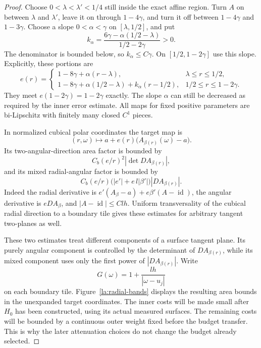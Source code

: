 \documentclass[11pt]{article}
\numberwithin{equation}{section}
\theoremstyle{definition}
\theoremstyle{remark}
\begin{document}
\begin{proof}
Choose $0<\lambda<\lambda'<1/4$ still inside the exact affine region.
Turn $A$ on between $\lambda$ and $\lambda'$, leave it on through
$1-4\gamma$, and turn it off between $1-4\gamma$ and $1-3\gamma$.
Choose a slope $0<\alpha<\gamma$ on $[\lambda,1/2]$, and put
\[
 k_\alpha=
 \frac{6\gamma-\alpha(1/2-\lambda)}{1/2-2\gamma}>0.
\]
The denominator is bounded below, so $k_\alpha\le C\gamma$.
On $[1/2,1-2\gamma]$ use this slope.  Explicitly, these portions are
\[
 e(r)=
 \begin{cases}
  1-8\gamma+\alpha(r-\lambda),&\lambda\le r\le1/2,\\
  1-8\gamma+\alpha(1/2-\lambda)+k_\alpha(r-1/2),
       &1/2\le r\le1-2\gamma.
 \end{cases}
\]
They meet $e(1-2\gamma)=1-2\gamma$ exactly.  The slope $\alpha$
can still be decreased as required by the inner error estimate.
All maps for fixed positive parameters are bi-Lipschitz with
finitely many closed $C^1$ pieces.

In normalized cubical polar coordinates the target map is
\[
 (r,\omega)\longmapsto
       a+e(r)\bigl(A_{\beta(r)}(\omega)-a\bigr).
\]
Its two-angular-direction area factor is bounded by
\begin{equation}\label{la:two-angular}
 C_b(e/r)^2|\det DA_{\beta(r)}|,
\end{equation}
and its mixed radial-angular factor is bounded by
\begin{equation}\label{la:mixed-angular}
 C_b(e/r)\bigl(|e'|+e\,l|\beta'|\bigr)|DA_{\beta(r)}|.
\end{equation}
Indeed the radial derivative is
$e'(A_\beta-a)+e\beta'(A-\operatorname{id})$, the angular derivative is $eDA_\beta$,
and $|A-\operatorname{id}|\le Clh$.  Uniform transversality of the cubical radial
direction to a boundary tile gives these estimates for arbitrary
tangent two-planes as well.

These two estimates treat different components of a surface tangent
plane.  Its purely angular component is controlled by the determinant
of $DA_{\beta(r)}$, while its mixed component uses only the first power
of $|DA_{\beta(r)}|$.  Write
\[
 G(\omega)=1+\frac{lh}{|\omega-u_j|}
\]
on each boundary tile.  Figure~\ref{la:radial-bands} displays the
resulting area bounds in the unexpanded target coordinates.  The inner
costs will be made small after $H_0$ has been constructed, using its
actual measured surfaces.  The remaining costs will be bounded by a
continuous outer weight fixed before the budget transfer.  This is why
the later attenuation choices do not change the budget already selected.


\end{proof}
\end{document}
